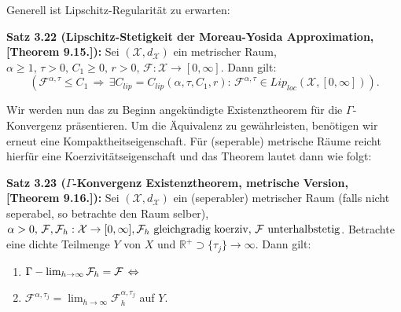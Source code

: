 Generell ist Lipschitz-Regularität zu erwarten:\\[0.5cm]
\colorbox{generalYellow}{\begin{minipage}{16cm}{\textcolor{black}{}{\label{theo3.22}}}
\textbf{Satz 3.22 (Lipschitz-Stetigkeit der Moreau-Yosida Approximation, \cite{MasoGamma}[Theorem 9.15.]):} Sei \((\mathcal{X},d_{\mathcal{X}})\) ein metrischer Raum, \(\alpha \geq 1, \, \tau > 0, \, C_1 \geq 0, \, r > 0, \, \mathcal{F} : \mathcal{X} \to [0,\infty]\). Dann gilt:
\begin{equation}
    (\mathcal{F}^{\alpha, \tau} \leq C_1 \, \Rightarrow \, \exists C_{lip} = C_{lip} (\alpha,\tau,C_1,r) : \, \mathcal{F}^{\alpha,\tau} \in Lip_{loc}(\mathcal{X},[0,\infty])).
\end{equation}
\end{minipage}}

Wir werden nun das zu Beginn angekündigte Existenztheorem für die \(\Gamma\)-Konvergenz präsentieren. Um die Äquivalenz zu gewährleisten, benötigen wir erneut eine Kompaktheitseigenschaft. Für (seperable) metrische Räume reicht hierfür eine Koerzivitätseigenschaft und das Theorem lautet dann wie folgt:\\[0.5cm]
\colorbox{generalYellow}{\begin{minipage}{16cm}{\textcolor{black}{}{\label{theo3.23}}}
\textbf{Satz 3.23 (\(\Gamma\)-Konvergenz Existenztheorem, metrische Version, \cite{MasoGamma}[Theorem 9.16.]):} Sei \((\mathcal{X},d_{\mathcal{X}})\) ein (seperabler) metrischer Raum (falls nicht seperabel, so betrachte den Raum selber), \(\alpha > 0, \, \mathcal{F}, \mathcal{F}_h : \mathcal{X} \to [0,\infty], \\ \mathcal{F}_h \text{ gleichgradig koerziv}, \, \mathcal{F} \text{ unterhalbstetig}\). Betrachte eine dichte Teilmenge \(Y\) von \(X\) und \(\mathbb{R}^+ \supset \{\tau_j\} \to \infty\). Dann gilt:
\begin{enumerate}
    \item \(\Gamma - \lim_{h \to \infty} \mathcal{F}_h = \mathcal{F} \, \Leftrightarrow\)
    \item \(\mathcal{F}^{\alpha, \tau_j} = \lim_{h \to \infty} \mathcal{F}_h^{\alpha, \tau_j}\) auf \(Y\).
\end{enumerate}
\end{minipage}}
